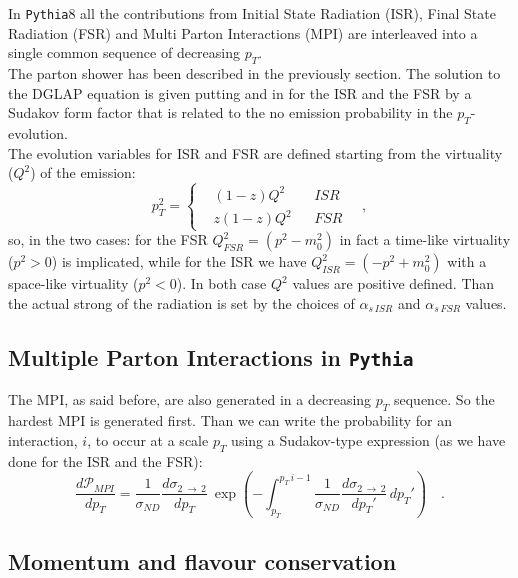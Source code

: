  In \texttt{Pythia}8 all the contributions from Initial State Radiation (ISR), Final State Radiation (FSR) and Multi Parton Interactions (MPI) are interleaved into a single common sequence of decreasing $p_T$. 
\\
The parton shower has been described in the previously section. The solution to the DGLAP equation is given putting  and  in  for the ISR and the FSR by a Sudakov form factor that is related to the no emission probability in the $p_T$-evolution. 
\\
The evolution variables for ISR and FSR are defined starting from the virtuality ($Q^2$) of the emission:
\begin{equation}
	p_T^2=\left\{\begin{aligned}
		&(1-z)Q^2 && ISR\\
		&z(1-z)Q^2 && FSR
	\end{aligned}\right.\quad,
	\label{eq:partonShowerEvolutionVariables}
\end{equation}
so, in the two cases: for the FSR $Q^2_{FSR}=(p^2-m_0^2)$ in fact a time-like virtuality ($p^2>0$) is implicated, while for the ISR we have $Q^2_{ISR}=(-p^2+m_0^2)$ with a space-like virtuality ($p^2<0$). In both case $Q^2$ values are positive defined. Than the actual strong of the radiation is set by the choices of $\alpha_{s\,ISR}$ and $\alpha_{s\,FSR}$ values.

\subsection{Multiple Parton Interactions in \texttt{Pythia}}

The MPI, as said before, are also generated in a decreasing $p_T$ sequence. So the hardest MPI is generated first. Than we can write the probability for an interaction, $i$, to occur at a scale $p_T$ using a Sudakov-type expression (as we have done for the ISR and the FSR):
\begin{equation}
	\frac{d\mathcal{P}_{MPI}}{dp_T}=\frac{1}{\sigma_{ND}}\frac{d\sigma_{2\,\rightarrow\,2}}{dp_T}\ \exp\left( -\displaystyle\int_{p_T}^{p_T\,i-1} \frac{1}{\sigma_{ND}}\frac{d\sigma_{2\,\rightarrow\,2}}{dp_T'}\,dp_T' \right)\quad .
\end{equation}


\subsection{Momentum and flavour conservation}

